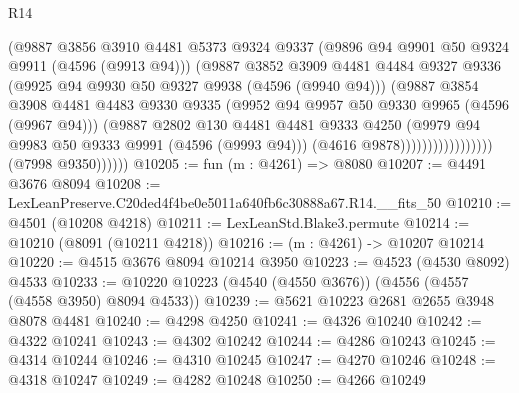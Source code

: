\begin{lexlean}{R14}
\begin{coremodule}
                                      (@9887
                                        @3856
                                        @3910
                                        @4481
                                        @5373
                                        @9324
                                        @9337
                                        (@9896 @94 @9901 @50 @9324 @9911 (@4596 (@9913 @94)))
                                        (@9887
                                          @3852
                                          @3909
                                          @4481
                                          @4484
                                          @9327
                                          @9336
                                          (@9925 @94 @9930 @50 @9327 @9938 (@4596 (@9940 @94)))
                                          (@9887
                                            @3854
                                            @3908
                                            @4481
                                            @4483
                                            @9330
                                            @9335
                                            (@9952 @94 @9957 @50 @9330 @9965 (@4596 (@9967 @94)))
                                            (@9887
                                              @2802
                                              @130
                                              @4481
                                              @4481
                                              @9333
                                              @4250
                                              (@9979 @94 @9983 @50 @9333 @9991 (@4596 (@9993 @94)))
                                              (@4616 @9878)))))))))))))))))
              (@7998 @9350))))))
@10205 := fun (m : @4261) => @8080
@10207 := @4491 @3676 @8094
@10208 := LexLeanPreserve.C20ded4f4be0e5011a640fb6c30888a67.R14.__fits_50
@10210 := @4501 (@10208 @4218)
@10211 := LexLeanStd.Blake3.permute
@10214 := @10210 (@8091 (@10211 @4218))
@10216 := (m : @4261) -> @10207 @10214
@10220 := @4515 @3676 @8094 @10214 @3950
@10223 := @4523 (@4530 @8092) @4533
@10233 := @10220 @10223 (@4540 (@4550 @3676)) (@4556 (@4557 (@4558 @3950) @8094 @4533))
@10239 := @5621 @10223 @2681 @2655 @3948 @8078 @4481
@10240 := @4298 @4250
@10241 := @4326 @10240
@10242 := @4322 @10241
@10243 := @4302 @10242
@10244 := @4286 @10243
@10245 := @4314 @10244
@10246 := @4310 @10245
@10247 := @4270 @10246
@10248 := @4318 @10247
@10249 := @4282 @10248
@10250 := @4266 @10249

\end{coremodule}
\end{lexlean}
